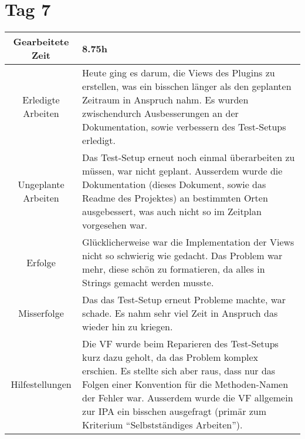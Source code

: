 \section{Tag 7}
\begin{tabularx}{\textwidth}[H]{|c|X|}
  \hline
  Gearbeitete Zeit & 8.75h \\ \hline
  Erledigte Arbeiten & Heute ging es darum, die Views des Plugins zu erstellen, was ein bisschen länger als den geplanten
  Zeitraum in Anspruch nahm. Es wurden zwischendurch Ausbesserungen an der Dokumentation, sowie verbessern des Test-Setups
  erledigt. \\ \hline
  Ungeplante Arbeiten & Das Test-Setup erneut noch einmal überarbeiten zu müssen, war nicht geplant. Ausserdem wurde die
  Dokumentation (dieses Dokument, sowie das Readme des Projektes) an bestimmten Orten ausgebessert, was auch nicht so im
  Zeitplan vorgesehen war. \\ \hline
  Erfolge & Glücklicherweise war die Implementation der Views nicht so schwierig wie gedacht. Das Problem war mehr, diese
  schön zu formatieren, da alles in Strings gemacht werden musste. \\ \hline
  Misserfolge & Das das Test-Setup erneut Probleme machte, war schade. Es nahm sehr viel Zeit in Anspruch das wieder hin zu
  kriegen. \\ \hline
  Hilfestellungen & Die VF wurde beim Reparieren des Test-Setups kurz dazu geholt, da das Problem komplex erschien.
  Es stellte sich aber raus, dass nur das Folgen einer Konvention für die Methoden-Namen der Fehler war. \newline
  Ausserdem wurde die VF allgemein zur IPA ein bisschen ausgefragt (primär zum Kriterium
  \enquote{Selbstständiges Arbeiten}).
  \\
  \hline
\end{tabularx}

\newpage

